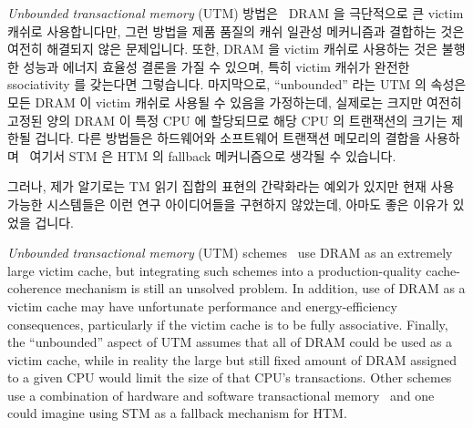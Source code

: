 \iffalse

There has been some research work to alleviate this limitation.
Fully associative \emph{victim caches} would alleviate the associativity
constraints, but there are currently stringent performance and
energy-efficiency constraints on the sizes of victim caches.
That said, HTM victim caches for unmodified cache lines can be quite
small, as they need to retain only the address:
The data itself can be written to memory or shadowed by other caches,
while the address itself is sufficient to detect a conflicting
write~\cite{RaviRajwar2012TSX}.

\fi

\emph{Unbounded transactional memory} (UTM)
방법은~\cite{CScottAnanian2006,KevinEMoore2006}
DRAM 을 극단적으로 큰 victim 캐쉬로 사용합니다만, 그런 방법을 제품 품질의 캐쉬
일관성 메커니즘과 결합하는 것은 여전히 해결되지 않은 문제입니다.
또한, DRAM 을 victim 캐쉬로 사용하는 것은 불행한 성능과 에너지 효율성 결론을
가질 수 있으며, 특히 victim 캐쉬가 완전한 ssociativity 를 갖는다면 그렇습니다.
마지막으로, ``unbounded'' 라는 UTM 의 속성은 모든 DRAM 이 victim 캐쉬로 사용될
수 있음을 가정하는데, 실제로는 크지만 여전히 고정된 양의 DRAM 이 특정 CPU 에
할당되므로 해당 CPU 의 트랜잭션의 크기는 제한될 겁니다.
다른 방법들은 하드웨어와 소프트웨어 트랜잭션 메모리의 결합을
사용하며~\cite{SanjeevKumar2006} 여기서 STM 은 HTM 의 fallback 메커니즘으로
생각될 수 있습니다.

그러나, 제가 알기로는 TM 읽기 집합의 표현의 간략화라는 예외가 있지만 현재 사용
가능한 시스템들은 이런 연구 아이디어들을 구현하지 않았는데, 아마도 좋은 이유가
있었을 겁니다.

\iffalse

\emph{Unbounded transactional memory} (UTM)
schemes~\cite{CScottAnanian2006,KevinEMoore2006}
use DRAM as an extremely large victim cache, but integrating such schemes
into a production-quality cache-coherence mechanism is still an unsolved
problem.
In addition, use of DRAM as a victim cache may have unfortunate
performance and energy-efficiency consequences, particularly
if the victim cache is to be fully associative.
Finally, the ``unbounded'' aspect of UTM assumes that all of DRAM
could be used as a victim cache, while in reality
the large but still fixed amount of DRAM assigned to a given CPU
would limit the size of that CPU's transactions.
Other schemes use a combination of hardware and software transactional
memory~\cite{SanjeevKumar2006} and one could imagine using STM as a
fallback mechanism for HTM\@.

